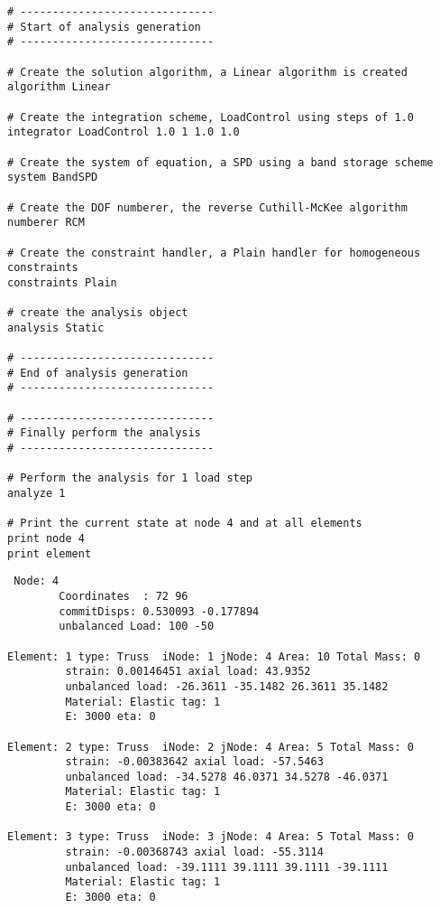 \documentclass[12pt]{article}
\begin{document}
{\begin{verbatim}
# ------------------------------
# Start of analysis generation
# ------------------------------

# Create the solution algorithm, a Linear algorithm is created
algorithm Linear

# Create the integration scheme, LoadControl using steps of 1.0
integrator LoadControl 1.0 1 1.0 1.0

# Create the system of equation, a SPD using a band storage scheme
system BandSPD

# Create the DOF numberer, the reverse Cuthill-McKee algorithm
numberer RCM

# Create the constraint handler, a Plain handler for homogeneous constraints
constraints Plain

# create the analysis object 
analysis Static 

# ------------------------------
# End of analysis generation
# ------------------------------

# ------------------------------
# Finally perform the analysis
# ------------------------------

# Perform the analysis for 1 load step
analyze 1

# Print the current state at node 4 and at all elements
print node 4
print element

\end{verbatim}
}


\vspace{0.2in} 

{\sf\small
\begin{verbatim}
 Node: 4
        Coordinates  : 72 96 
        commitDisps: 0.530093 -0.177894 
        unbalanced Load: 100 -50 

Element: 1 type: Truss  iNode: 1 jNode: 4 Area: 10 Total Mass: 0 
         strain: 0.00146451 axial load: 43.9352 
         unbalanced load: -26.3611 -35.1482 26.3611 35.1482 
         Material: Elastic tag: 1
         E: 3000 eta: 0

Element: 2 type: Truss  iNode: 2 jNode: 4 Area: 5 Total Mass: 0 
         strain: -0.00383642 axial load: -57.5463 
         unbalanced load: -34.5278 46.0371 34.5278 -46.0371 
         Material: Elastic tag: 1
         E: 3000 eta: 0

Element: 3 type: Truss  iNode: 3 jNode: 4 Area: 5 Total Mass: 0 
         strain: -0.00368743 axial load: -55.3114 
         unbalanced load: -39.1111 39.1111 39.1111 -39.1111 
         Material: Elastic tag: 1
         E: 3000 eta: 0
\end{verbatim}
}
\end{document}

